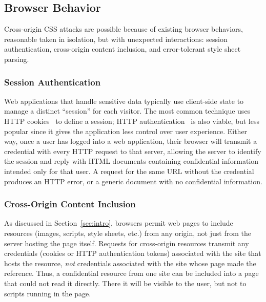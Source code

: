 \documentclass{acm_proc_article-sp}
\begin{document}
\subsection{Browser Behavior} \label{sec:behavior}

Cross-origin CSS attacks are possible because of existing browser
behaviors, reasonable taken in isolation, but with unexpected
interactions: session authentication, cross-origin content inclusion,
and error-tolerant style sheet parsing.

\subsubsection{Session Authentication}
Web applications that handle sensitive data typically use client-side
state to manage a distinct “session” for each visitor.  The most
common technique uses HTTP cookies~\cite{rfc2109,httpstate} to define
a session; HTTP authentication~\cite{rfc2617} is also viable, but less
popular since it gives the application less control over user
experience.  Either way, once a user has logged into a web
application, their browser will transmit a credential with every HTTP
request to that server, allowing the server to identify the session
and reply with HTML documents containing confidential information
intended only for that user.  A request for the same URL without the
credential produces an HTTP error, or a generic document with no
confidential information.

\subsubsection{Cross-Origin Content Inclusion}
As discussed in Section~\ref{sec:intro}, browsers permit web pages to
include resources (images, scripts, style sheets, etc.) from any
origin, not just from the server hosting the page itself. Requests for
cross-origin resources transmit any credentials (cookies or HTTP
authentication tokens) associated with the site that hosts the
resource, \emph{not} credentials associated with the site whose page
made the reference. Thus, a confidential resource from one site can
be included into a page that could not read it directly. 
There it will be visible to the user, but not to scripts running in the page.

\end{document}
